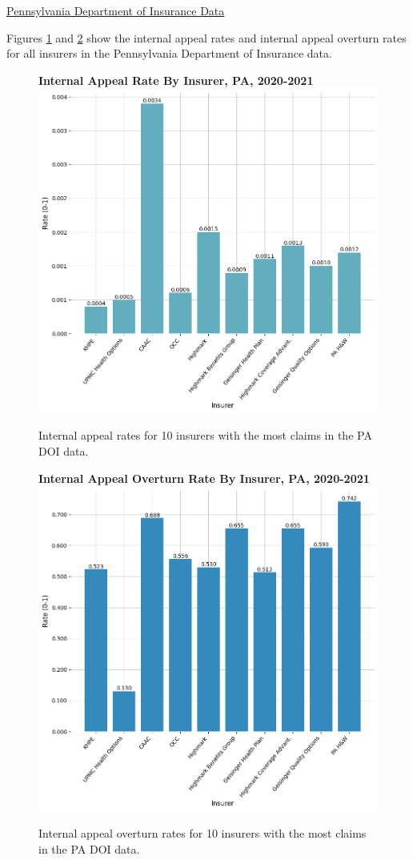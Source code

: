 \documentclass[12pt, a4paper,twoside]{report}
\theoremstyle{plain} %
\theoremstyle{definition} %
\theoremstyle{remark} %
\numberwithin{equation}{chapter}
\begin{document}
		\clearpage
		
		
		\underline{Pennsylvania Department of Insurance Data}

		Figures \ref{painternalappealratebyinsurer} and \ref{painternalappealoverturnratebyinsurer} show the internal appeal rates and internal appeal overturn rates for all insurers in the Pennsylvania Department of Insurance data.
		
		\begin{figure}[h!]
			\centering
			\textbf{Internal Appeal Rate By Insurer, PA, 2020-2021}
			\includegraphics[width=.8\columnwidth]{images/pa_claims/appeal_rate_by_insurer.png}
			\caption{Internal appeal rates for 10 insurers with the most claims in the PA DOI data.}
			\label{painternalappealratebyinsurer}
		\end{figure}
		
		
		\begin{figure}[h!]
			\centering
			\textbf{Internal Appeal Overturn Rate By Insurer, PA, 2020-2021}
			\includegraphics[width=.8\columnwidth]{images/pa_claims/internal_appeal_overturn_rate_by_insurer.png}
			\caption{Internal appeal overturn rates for 10 insurers with the most claims in the PA DOI data.}
			\label{painternalappealoverturnratebyinsurer}
		\end{figure}
		
\end{document}
